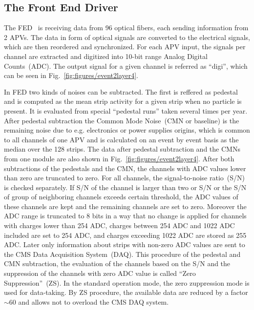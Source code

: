 
\subsection{The Front End Driver}

The FED~\cite{Baird:2002wg} is receiving data from 96 optical fibers, each sending information from 2 APVs. The data in form of optical signals are converted to the electrical signals, which are then reordered and synchronized. For each APV input, the signals per channel are extracted and digitized into 10-bit range Analog Digital Counts~(ADC). The output signal for a given channel is referred as ``digi'', which can be seen in Fig.~\ref{fig:figures/event2layer4}.

In FED two kinds of noises can be subtracted. The first is reffered as pedestal and is computed as the mean strip activity for a given strip when no particle is present. It is evaluated from special ``pedestal runs'' taken several times per year. After pedestal subtraction the Common Mode Noise~(CMN or baseline) is the remaining noise due to e.g. electronics or power supplies origins, which is common to all channels of one APV and is calculated on an event by event basis as the median over the 128 strips. The data after pedestal subtraction and the CMNs from one module are also shown in Fig.~\ref{fig:figures/event2layer4}. After both subtractions of the pedestals and the CMN, the channels with ADC values lower than zero are truncated to zero. For all channels, the signal-to-noise ratio~(S/N) is checked separately. If S/N of the channel is larger than two or S/N or the S/N of group of neighboring channels exceeds certain threshold, the ADC values of these channels are kept and the remaining channels are set to zero. Moreover the ADC range is truncated to 8 bits in a way that no change is applied for channels with charges lower than 254 ADC, charges between 254 ADC and 1022 ADC included are set to 254 ADC, and charges exceeding 1022 ADC are stored as 255 ADC. Later only information about strips with non-zero ADC values are sent to the CMS Data Acquisition System~(DAQ).  This procedure of the pedestal and CMN subtraction, the evaluation of the channels based on the S/N and the suppression of the channels with zero ADC value is called ``Zero Suppression''~(ZS). In the standard operation mode, the zero zuppression mode is used for data-taking. By ZS procedure, the available data are reduced by a factor $\sim$60 and allows not to overload the CMS DAQ system.

